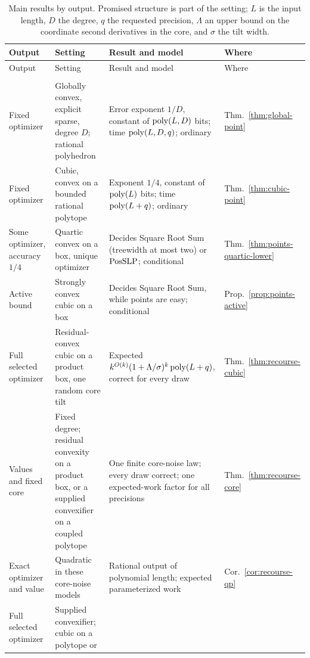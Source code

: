 {\small
\setlength{\tabcolsep}{4pt}
\setlength{\LTcapwidth}{\textwidth}
\begin{longtable}{@{}>{\raggedright\arraybackslash}p{}
  >{\raggedright\arraybackslash}p{}
  >{\raggedright\arraybackslash}p{}
  >{\raggedright\arraybackslash}p{}@{}}
\caption{Main results by output. Promised structure is part of the setting;
$L$ is the input length, $D$ the degree, $q$ the requested precision,
$\Lambda$ an upper bound on the coordinate second derivatives in the core, and
$\sigma$ the tilt width.}
\label{tab:intro-results}\\
\toprule
Output & Setting & Result and model & Where\\
\midrule
\endfirsthead
\toprule
Output & Setting & Result and model & Where\\
\midrule
\endhead
\bottomrule
\endfoot
\multicolumn{4}{@{}l}{\emph{Values and points}}\\*
Fixed optimizer & Globally convex, explicit sparse, degree $D$; rational
polyhedron & Error exponent $1/D$, constant of $\operatorname{poly}(L,D)$ bits; time
$\operatorname{poly}(L,D,q)$; ordinary & Thm.~\ref{thm:global-point}\\
Fixed optimizer & Cubic, convex on a bounded rational polytope & Exponent
$1/4$, constant of $\operatorname{poly}(L)$ bits; time $\operatorname{poly}(L+q)$; ordinary &
Thm.~\ref{thm:cubic-point}\\
Some optimizer, accuracy $1/4$ & Quartic convex on a box, unique optimizer &
Decides Square Root Sum (treewidth at most two) or $\mathrm{PosSLP}$; conditional &
Thm.~\ref{thm:points-quartic-lower}\\
Active bound & Strongly convex cubic on a box & Decides Square Root Sum, while
points are easy; conditional & Prop.~\ref{prop:points-active}\\
Full selected optimizer & Residual-convex cubic on a product box, one random
core tilt & Expected $k^{O(k)}(1+\Lambda/\sigma)^k\operatorname{poly}(L+q)$, correct for
every draw & Thm.~\ref{thm:recourse-cubic}\\
Values and fixed core & Fixed degree; residual convexity on a product box,
or a supplied convexifier on a coupled polytope & One finite core-noise law;
every draw correct; one expected-work factor for all precisions &
Thm.~\ref{thm:recourse-core}\\
Exact optimizer and value & Quadratic in these core-noise models & Rational
output of polynomial length; expected parameterized work &
Cor.~\ref{cor:recourse-qp}\\
Full selected optimizer & Supplied convexifier; cubic on a polytope or

\end{longtable}}
